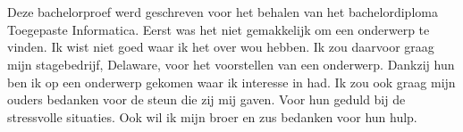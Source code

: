 
\chapter*{}
\label{ch:voorwoord}

Deze bachelorproef werd geschreven voor het behalen van het bachelordiploma Toegepaste Informatica. Eerst was het niet gemakkelijk om een onderwerp te vinden. Ik wist niet goed waar ik het over wou hebben. Ik zou daarvoor graag mijn stagebedrijf, Delaware, voor het voorstellen van een onderwerp. Dankzij hun ben ik op een onderwerp gekomen waar ik interesse in had. 
Ik zou ook graag mijn ouders bedanken voor de steun die zij mij gaven. Voor hun geduld bij de stressvolle situaties. Ook wil ik mijn broer en zus bedanken voor hun hulp.
